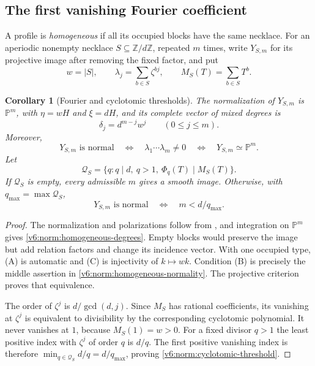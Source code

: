 \documentclass[10pt,fleqn]{article}
\numberwithin{equation}{section}
\newtheorem{corollary}[theorem]{Corollary}
\newcommand{\PP}{\mathbb P}
\begin{document}
\subsection{The first vanishing Fourier coefficient}
A profile is \emph{homogeneous} if all its occupied blocks have the same
necklace.  For an aperiodic nonempty necklace \(S\subseteq\mathbb Z/d\mathbb
Z\), repeated \(m\) times, write \(Y_{S,m}\) for its projective image after
removing the fixed factor, and put
\[
 w=|S|,\qquad \lambda_j=\sum_{b\in S}\zeta^{bj},\qquad
 M_S(T)=\sum_{b\in S}T^b.
\]
\begin{corollary}[Fourier and cyclotomic thresholds]
\label{v6:norm:homogeneous-threshold}
The normalization of $Y_{S,m}$ is $\PP^m$, with
$\eta=wH$ and $\xi=dH$, and its complete vector of mixed degrees is
\begin{equation}\label{v6:norm:homogeneous-degrees}
 \delta_j=d^{m-j}w^j\qquad(0\le j\le m).
\end{equation}
Moreover,
\begin{equation}\label{v6:norm:homogeneous-normality}
 Y_{S,m}\text{ is normal}\quad\Longleftrightarrow\quad
 \lambda_1\cdots\lambda_m\ne0
 \quad\Longleftrightarrow\quad Y_{S,m}\simeq\PP^m.
\end{equation}
Let
\[
 \mathcal Q_S=
 \{q:q\mid d,\ q>1,\ \Phi_q(T)\mid M_S(T)\}.
\]
If $\mathcal Q_S$ is empty, every admissible $m$ gives a smooth
image.  Otherwise, with $q_{\max}=\max\mathcal Q_S$,
\begin{equation}\label{v6:norm:cyclotomic-threshold}
 Y_{S,m}\text{ is normal}\quad\Longleftrightarrow\quad
 m<d/q_{\max}.
\end{equation}
\end{corollary}

\begin{proof}
The normalization and polarizations follow from \cite[Theorem~5.4]{LiProfileGeometry}, and integration on $\PP^m$ gives
\eqref{v6:norm:homogeneous-degrees}.  Empty blocks would preserve the image but add relation factors and
change its incidence vector.  With one occupied type, (A) is automatic
and (C) is injectivity of $k\mapsto wk$.
Condition (B) is precisely the middle assertion in
\eqref{v6:norm:homogeneous-normality}.  The projective criterion
proves that equivalence.

The order of $\zeta^j$ is $d/\gcd(d,j)$.  Since $M_S$ has rational
coefficients, its vanishing at $\zeta^j$ is equivalent to
divisibility by the corresponding cyclotomic polynomial.  It never
vanishes at $1$, because $M_S(1)=w>0$.  For a fixed divisor $q>1$
the least positive index with $\zeta^j$ of order $q$ is $d/q$.
The first positive vanishing index is therefore
$\min_{q\in\mathcal Q_S}d/q=d/q_{\max}$, proving
\eqref{v6:norm:cyclotomic-threshold}.
\end{proof}
\end{document}
